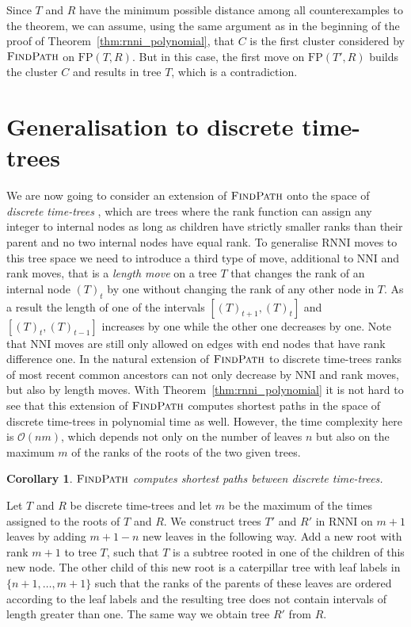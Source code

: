 \documentclass[11pt]{amsart}
\newtheorem{corollary}{Corollary}
\newcommand{\rnni}{\mathrm{RNNI}}
\newcommand{\findpath}{\textsc{FindPath}}
\newcommand{\nni}{\mathrm{NNI}}
\newcommand{\fp}{\mathrm{FP}}
\renewcommand{\O}{\mathcal O}
\newcommand{\summary}[1]{} %
\begin{document}
	Since $T$ and $R$ have the minimum possible distance among all counterexamples to the theorem, we can assume, using the same argument as in the beginning of the proof of Theorem~\ref{thm:rnni_polynomial}, that $C$ is the first cluster considered by $\findpath$ on $\fp(T, R)$.
	But in this case, the first move on $\fp(T',R)$ builds the cluster $C$ and results in tree $T$, which is a contradiction.
\endproof


\section{Generalisation to discrete time-trees}

\summary{Generalising $\findpath$ for discrete time-trees}
We are now going to consider an extension of $\findpath$ onto the space of \emph{discrete time-trees} \autocite{Gavryushkin2018-ol}, which are trees where the rank function can assign any integer to internal nodes as long as children have strictly smaller ranks than their parent and no two internal nodes have equal rank.
To generalise $\rnni$ moves to this tree space we need to introduce a third type of move, additional to $\nni$ and rank moves, that is a \emph{length move} on a tree $T$ that changes the rank of an internal node $(T)_t$ by one without changing the rank of any other node in $T$.
As a result the length of one of the intervals $[(T)_{t+1},(T)_t]$ and $[(T)_t,(T)_{t-1}]$ increases by one while the other one decreases by one.
Note that $\nni$ moves are still only allowed on edges with end nodes that have rank difference one.
In the natural extension of $\findpath$ to discrete time-trees ranks of most recent common ancestors can not only decrease by $\nni$ and rank moves, but also by length moves.
With Theorem~\ref{thm:rnni_polynomial} it is not hard to see that this extension of $\findpath$ computes shortest paths in the space of discrete time-trees in polynomial time as well.
However, the time complexity here is $\O(nm)$, which depends not only on the number of leaves $n$ but also on the maximum $m$ of the ranks of the roots of the two given trees.
\begin{corollary}
	$\findpath$ computes shortest paths between discrete time-trees.
    \label{cor:fp_dtt}
\end{corollary}

\proof
	Let $T$ and $R$ be discrete time-trees and let $m$ be the maximum of the times assigned to the roots of $T$ and $R$.
	We construct trees $T'$ and $R'$ in $\rnni$ on $m + 1$ leaves by adding $m + 1 - n$ new leaves in the following way.
	Add a new root with rank $m+1$ to tree $T$, such that $T$ is a subtree rooted in one of the children of this new node.
	The other child of this new root is a caterpillar tree with leaf labels in $\{n+1, \ldots, m+1\}$ such that the ranks of the parents of these leaves are ordered according to the leaf labels and the resulting tree does not contain intervals of length greater than one.
	The same way we obtain tree $R'$ from $R$.
\end{document}
